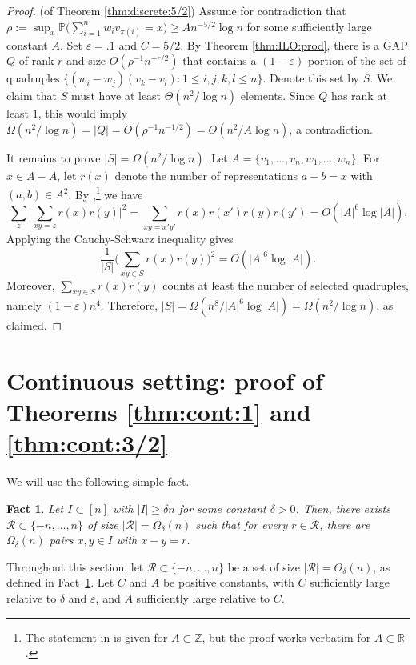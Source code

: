 \documentclass[reqno]{amsart}
\newcommand\R{{\mathbb{R}}}
\newcommand\Z{{\mathbb{Z}}}
\renewcommand\P{{\mathbb{P}}}
\newcommand\eps{{\varepsilon}}
\newcommand\CR{{\mathcal R}}
\theoremstyle{plain}
\newtheorem{fact}[theorem]{Fact}
\theoremstyle{definition}
\begin{document}
\begin{proof}(of Theorem \ref{thm:discrete:5/2}) Assume for contradiction that $\rho:=\sup_{x} \P\big( \sum_{i=1}^n w_i v_{\pi(i)} = x \big) \ge A n^{-5/2} \log n$ for some sufficiently large constant $A$. Set $\eps=.1$ and $C =5/2$. By Theorem \ref{thm:ILO:prod}, there is a GAP $Q$ of rank $r$ and size $O(\rho^{-1}n^{-r/2})$ that contains a $(1-\eps)$-portion of the set of quadruples $\{(w_{i}-w_{j})(v_{k} -v_{l}): 1\le i,j,k,l \le n\}$. Denote this set by $S$. We claim that $S$ must have at least  $\Theta(n^{2}/\log n)$ elements. Since $Q$ has rank at least $1$, this would imply $\Omega(n^2/\log n)=|Q|=O(\rho^{-1}n^{-1/2})=O(n^2/A\log n)$, a contradiction.

It remains to prove $|S|=\Omega(n^2/\log n)$. Let $A=\{v_1,\ldots,v_n,w_1,\ldots,w_n\}$. For $x\in A-A$, let $r(x)$ denote the number of representations $a-b=x$ with $(a,b)\in A^2$.  
By \cite[Theorem 3]{BW},\footnote{The statement in \cite{BW} is given for $A \subset \Z$, but the proof works verbatim for $A \subset \R$.} we have
\[ \sum_{z}\Big|\sum_{xy=z}r(x)r(y)\Big|^2=\sum_{xy=x'y'}r(x)r(x')r(y)r(y')=O(|A|^6\log |A|).
\]
Applying the Cauchy-Schwarz inequality gives
\[
\frac{1}{|S|}\Big(\sum_{xy\in S}r(x)r(y)\Big)^2=O(|A|^6\log |A|).
\]
Moreover, $\sum_{xy\in S}r(x)r(y)$ counts at least the number of selected quadruples, namely $(1-\eps)n^4$. Therefore, $|S|=\Omega(n^8/|A|^6\log |A|)=\Omega(n^2/\log n)$, as claimed.
\end{proof}





\section{Continuous setting: proof of Theorems \ref{thm:cont:1} and \ref{thm:cont:3/2}}\label{sect:linear}

We will use the following simple fact.

\begin{fact}\label{fact:R}
Let $ I \subset [n]$ with $ |I| \geq \delta n $ for some constant $ \delta > 0 $. Then, there exists $ \CR \subset \{-n, \dots, n\} $ of size $ |\CR|= \Omega_{\delta}(n)$ such that for every $ r \in \CR $, there are $ \Omega_{\delta}(n)$ pairs $x,y \in I$ with $x - y = r $.
\end{fact}

Throughout this section, let $\mathcal{R} \subset \{-n, \dots, n\}$ be a set of size $|\mathcal{R}| = \Theta_{\delta}(n)$, as defined in Fact~\ref{fact:R}. Let $C$ and $A$ be positive constants, with $C$ sufficiently large relative to $\delta$ and $\varepsilon$, and $A$ sufficiently large relative to $C$.
\end{document}
